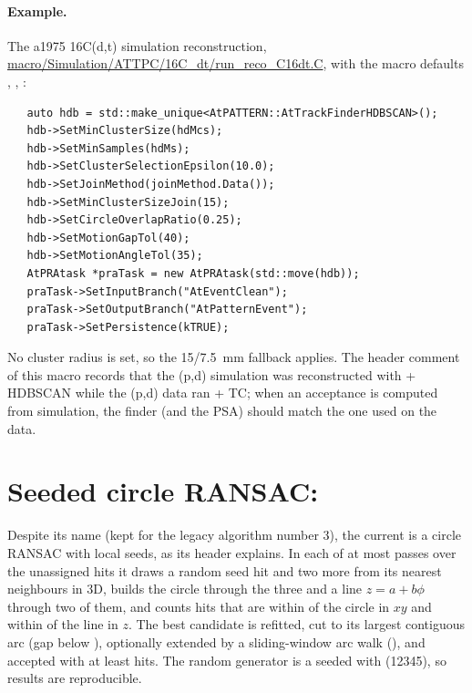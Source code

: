 \paragraph{Example.} The a1975 16C(d,t) simulation reconstruction,
\url{macro/Simulation/ATTPC/16C_dt/run_reco_C16dt.C}, with the macro defaults ,
, :
\begin{verbatim}
   auto hdb = std::make_unique<AtPATTERN::AtTrackFinderHDBSCAN>();
   hdb->SetMinClusterSize(hdMcs);
   hdb->SetMinSamples(hdMs);
   hdb->SetClusterSelectionEpsilon(10.0);
   hdb->SetJoinMethod(joinMethod.Data());
   hdb->SetMinClusterSizeJoin(15);
   hdb->SetCircleOverlapRatio(0.25);
   hdb->SetMotionGapTol(40);
   hdb->SetMotionAngleTol(35);
   AtPRAtask *praTask = new AtPRAtask(std::move(hdb));
   praTask->SetInputBranch("AtEventClean");
   praTask->SetOutputBranch("AtPatternEvent");
   praTask->SetPersistence(kTRUE);
\end{verbatim}
No cluster radius is set, so the 15/7.5~mm fallback applies. The header comment of this macro records
that the (p,d) simulation was reconstructed with  + HDBSCAN while the (p,d) data ran
 + TC; when an acceptance is computed from simulation, the finder (and the PSA) should match
the one used on the data.

\section{Seeded circle RANSAC: }
\label{sec:pr:riemann}

Despite its name (kept for the legacy algorithm number 3), the current  is a
circle RANSAC with local seeds, as its header explains. In each of at most  passes over
the unassigned hits it draws a random seed hit and two more from its  nearest neighbours in 3D,
builds the circle through the three and a line $z = a + b\phi$ through two of them, and counts hits that are
within  of the circle in $xy$ and within  of the line in $z$. The
best candidate is refitted, cut to its largest contiguous arc (gap below ), optionally
extended by a sliding-window arc walk (), and accepted with at least
 hits. The random generator is a  seeded with
 (12345), so results are reproducible.

